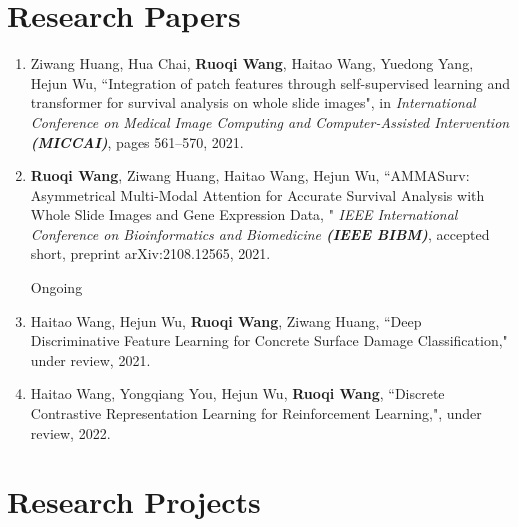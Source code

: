 \documentclass[a4,11pt]{article}
\begin{document}
\section{\large \textbf{Research Papers}} 
\begin{enumerate}[itemindent=0em]

\centerline{\textcolor{UI_blue}{Accepted}}
\item Ziwang Huang, Hua Chai, \textbf{Ruoqi Wang}, Haitao Wang, Yuedong Yang, Hejun Wu, ``Integration of patch features through self-supervised learning and transformer for survival analysis on whole slide images",  in \textit{International Conference on Medical Image Computing and Computer-Assisted Intervention \textbf{(MICCAI)}}, pages 561--570, 2021.

\item \textbf{Ruoqi Wang}, Ziwang Huang, Haitao Wang, Hejun Wu, ``AMMASurv: Asymmetrical Multi-Modal Attention for Accurate Survival Analysis with Whole Slide Images and Gene Expression Data, " \textit{IEEE International Conference on Bioinformatics and Biomedicine \textbf{(IEEE BIBM)}}, accepted short, preprint arXiv:2108.12565, 2021.

\vspace {6pt}

\centerline{\textcolor{UI_blue}{Ongoing}}
\vspace {-8pt}

\item Haitao Wang, Hejun Wu, \textbf{Ruoqi Wang}, Ziwang Huang, ``Deep Discriminative Feature Learning for Concrete Surface Damage Classification," under review, 2021.

\item Haitao Wang, Yongqiang You, Hejun Wu, \textbf{Ruoqi Wang}, ``Discrete Contrastive Representation Learning for Reinforcement Learning,", under review, 2022.
\end{enumerate}




\section{\large \textbf{Research Projects}} %
\end{document}
